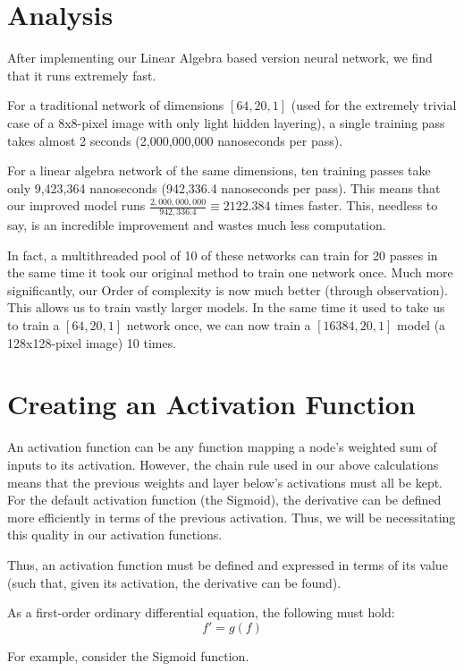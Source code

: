 \documentclass[8pt]{amsart}
\begin{document}
\section{Analysis}

After implementing our Linear Algebra based version neural network, we find that
it runs extremely fast.

For a traditional network of dimensions $[64, 20, 1]$ (used for the extremely
trivial case of a 8x8-pixel image with only light hidden layering), a single training
pass takes almost 2 seconds (2,000,000,000 nanoseconds per pass).

For a linear algebra network of the same dimensions, ten training passes take only
9,423,364 nanoseconds (942,336.4 nanoseconds per pass). This means that our improved
model runs $\frac{2,000,000,000}{942,336.4} \equiv 2122.384$ times faster. This, needless
to say, is an incredible improvement and wastes much less computation.

In fact, a multithreaded pool of 10 of these networks can train for 20 passes in the
same time it took our original method to train one network once. Much more significantly,
our Order of complexity is now much better (through observation). This allows us to
train vastly larger models. In the same time it used to take us to train a $[64, 20, 1]$
network once, we can now train a $[16384, 20, 1]$ model (a 128x128-pixel image) 10 times.

\section{Creating an Activation Function}

An activation function can be any function mapping
a node's weighted sum of inputs to its activation. However, the chain rule used
in our above calculations means that the previous weights and layer below's activations
must all be kept. For the default activation function (the Sigmoid), the derivative can
be defined more efficiently in terms of the previous activation. Thus, we will be
necessitating this quality in our activation functions.

Thus, an activation function must be defined and expressed in terms of its value (such
that, given its activation, the derivative can be found).

As a first-order ordinary differential equation, the following must hold:
\[
    f' = g(f)
\]

For example, consider the Sigmoid function.
\end{document}
